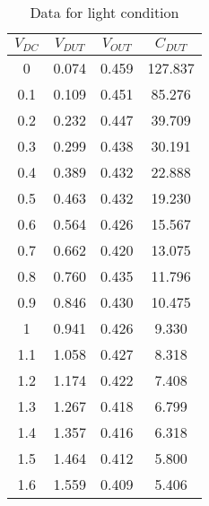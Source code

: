 \begin{table}[H]
    \centering
    \begin{tabular}{|c|c|c|c|}
        \hline
        $V_{DC}$ & $V_{DUT}$ & $V_{OUT}$ & $C_{DUT}$   \\ \hline
        0        & 0.074     & 0.459     & 127.837 \\
        0.1      & 0.109     & 0.451     &  85.276 \\
        0.2      & 0.232     & 0.447     &  39.709 \\
        0.3      & 0.299     & 0.438     &  30.191 \\
        0.4      & 0.389     & 0.432     &  22.888 \\
        0.5      & 0.463     & 0.432     &  19.230 \\
        0.6      & 0.564     & 0.426     &  15.567 \\
        0.7      & 0.662     & 0.420     &  13.075 \\
        0.8      & 0.760     & 0.435     &  11.796 \\
        0.9      & 0.846     & 0.430     &  10.475 \\
        1        & 0.941     & 0.426     &   9.330 \\
        1.1      & 1.058     & 0.427     &   8.318 \\
        1.2      & 1.174     & 0.422     &   7.408 \\
        1.3      & 1.267     & 0.418     &   6.799 \\
        1.4      & 1.357     & 0.416     &   6.318 \\
        1.5      & 1.464     & 0.412     &   5.800 \\
        1.6      & 1.559     & 0.409     &   5.406 \\ \hline
    \end{tabular}
    \caption{Data for light condition}
    \label{tab:2}
\end{table}